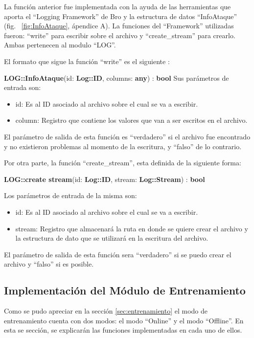 La función anterior fue implementada con la ayuda de las herramientas
que aporta el ``Logging Framework'' de Bro y la estructura de datos ``InfoAtaque'' (fig. ~\ref{fig:InfoAtaque}, ápendice A). La funciones del ``Framework'' utilizadas fueron: ``write'' para escribir sobre el archivo y ``create\_stream'' para crearlo. Ambas pertenecen al modulo ``LOG''. 

El formato que sigue la función ``write'' es el siguiente :

\textbf{LOG::InfoAtaque}(id: \textbf{Log::ID}, columns: \textbf{any}) : \textbf{bool}
Sus parámetros de entrada son:

\begin{itemize}
\item id: Es al ID asociado al archivo sobre el cual se va a escribir.
\item column: Registro que contiene los valores que van a ser escritos en el
archivo.
\end{itemize}

El parámetro de salida de esta función es ``verdadero'' si el archivo fue encontrado y no existieron problemas al momento de la escritura, y ``falso'' de
lo contrario.

Por otra parte, la función ``create\_stream'', esta definida de la siguiente
forma:

\textbf{LOG::create stream}(id: \textbf{Log::ID}, stream: \textbf{Log::Stream}) : \textbf{bool}

Los parámetros de entrada de la misma son:

\begin{itemize}
\item id: Es al ID asociado al archivo sobre el cual se va a escribir.
\item stream: Registro que almacenará la ruta en donde se quiere crear el
archivo y la estructura de dato que se utilizará en la escritura del
archivo.
\end{itemize}

El parámetro de salida de esta función sera ``verdadero'' si se puedo crear el
archivo y ``falso'' si es posible.


\subsection{Implementación del Módulo de Entrenamiento}

Como se pudo apreciar en la sección \ref{sec:entrenamiento} el modo de entrenamiento cuenta con dos modos: el modo ``Online'' y el modo ``Offline''. En esta se sección, se explicarán las funciones implementadas en cada uno de ellos.

